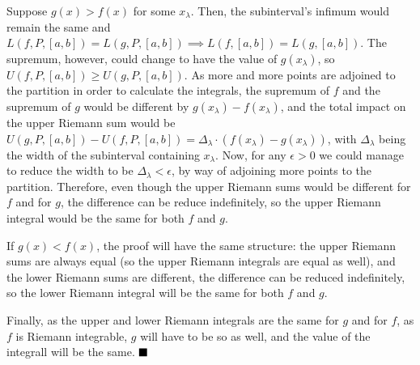 \documentclass[11pt, a4paper, tikz]{article}
\renewcommand{\qed}{\hfill\blacksquare}
\begin{document}
	Suppose $g(x) > f(x)$ for some $x_\lambda$. Then, the subinterval's infimum would remain the same and $L(f,P,[a,b]) = L(g,P,[a,b])\implies L(f,[a,b])=L(g,[a,b])$. The supremum, however, could change to have the value of $g(x_\lambda)$, so $U(f,P,[a,b]) \geq U(g,P,[a,b])$. As more and more points are adjoined to the partition in order to calculate the integrals, the supremum of $f$ and the supremum of $g$ would be different by $g(x_\lambda)-f(x_\lambda)$, and the total impact on the upper Riemann sum would be $U(g,P,[a,b])-U(f,P,[a,b]) = \Delta_\lambda\cdot(f(x_\lambda)-g(x_\lambda))$, with $\Delta_\lambda$ being the width of the subinterval containing $x_\lambda$. Now, for any $\epsilon>0$ we could manage to reduce the width to be $\Delta_\lambda<\epsilon$, by way of adjoining more points to the partition. Therefore, even though the upper Riemann sums would be different for $f$ and for $g$, the difference can be reduce indefinitely, so the upper Riemann integral would be the same for both $f$ and $g$.
	
	If $g(x) < f(x)$, the proof will have the same structure: the upper Riemann sums are always equal (so the upper Riemann integrals are equal as well), and the lower Riemann sums are different, the difference can be reduced indefinitely, so the lower Riemann integral will be the same for both $f$ and $g$.
	
	Finally, as the upper and lower Riemann integrals are the same for $g$ and for $f$, as $f$ is Riemann integrable, $g$ will have to be so as well, and the value of the integrall will be the same.
	$\qed$	
	
\end{document}
